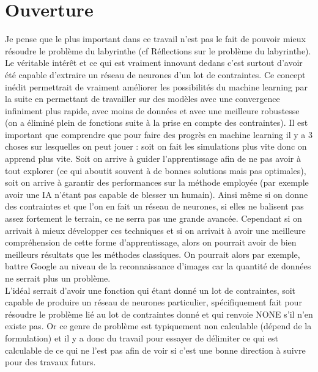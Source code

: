 \documentclass[10pt]{article}
\begin{document}
\section{Ouverture}
Je pense que le plus important dans ce travail n'est pas le fait de pouvoir mieux résoudre le problème du labyrinthe (cf Réflections sur le problème du labyrinthe). Le véritable intérêt et ce qui est vraiment innovant dedans c'est surtout d'avoir été capable d'extraire un réseau de neurones d'un lot de contraintes. Ce concept inédit permettrait de vraiment améliorer les possibilités du machine learning par la suite en permettant de travailler sur des modèles avec une convergence infiniment plus rapide, avec moins de données et avec une meilleure robustesse (on a éliminé plein de fonctions suite à la prise en compte des contraintes). Il est important que comprendre que pour faire des progrès en machine learning il y a 3 choses sur lesquelles on peut jouer : soit on fait les simulations plus vite donc on apprend plus vite. Soit on arrive à guider l'apprentissage afin de ne pas avoir à tout explorer (ce qui aboutit souvent à de bonnes solutions mais pas optimales), soit on arrive à garantir des performances sur la méthode employée (par exemple avoir une IA n'étant pas capable de blesser un humain). Ainsi même si on donne des contraintes et que l'on en fait un réseau de neurones, si elles ne balisent pas assez fortement le terrain, ce ne serra pas une grande avancée. Cependant si on arrivait à mieux développer ces techniques et si on arrivait à avoir une meilleure compréhension de cette forme d'apprentissage, alors on pourrait avoir de bien meilleurs résultats que les méthodes classiques. On pourrait alors par exemple, battre Google au niveau de la reconnaissance d'images car la quantité de données ne serrait plus un problème.\\
L'idéal serrait d'avoir une fonction qui étant donné un lot de contraintes, soit capable de produire un réseau de neurones particulier, spécifiquement fait pour résoudre le problème lié au lot de contraintes donné et qui renvoie NONE s'il n'en existe pas. Or ce genre de problème est typiquement non calculable (dépend de la formulation) et il y a donc du travail pour essayer de délimiter ce qui est calculable de ce qui ne l'est pas afin de voir si c'est une bonne direction à suivre pour des travaux futurs.
\end{document}
